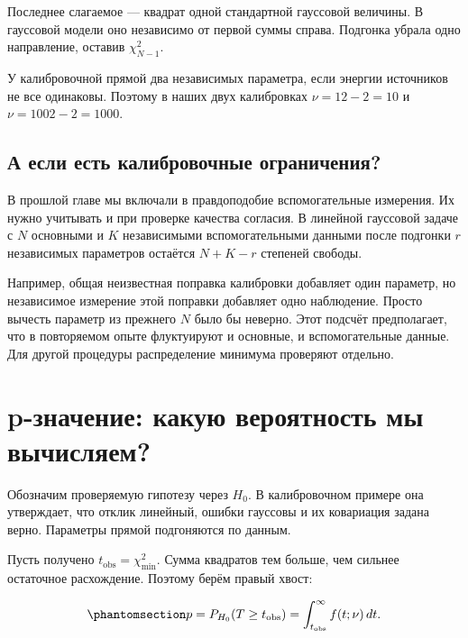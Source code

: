 \documentclass[
  russian,
  11pt,
  a4paper,
  open=any]{scrbook}
\begin{document}
Последнее слагаемое --- квадрат одной стандартной гауссовой величины. В
гауссовой модели оно независимо от первой суммы справа. Подгонка убрала
одно направление, оставив \(\chi^2_{N-1}\).

У калибровочной прямой два независимых параметра, если энергии
источников не все одинаковы. Поэтому в наших двух калибровках
\(\nu=12-2=10\) и \(\nu=1002-2=1000\).

\subsection{А если есть калибровочные
ограничения?}\label{ux430-ux435ux441ux43bux438-ux435ux441ux442ux44c-ux43aux430ux43bux438ux431ux440ux43eux432ux43eux447ux43dux44bux435-ux43eux433ux440ux430ux43dux438ux447ux435ux43dux438ux44f}

В прошлой главе мы включали в правдоподобие вспомогательные измерения.
Их нужно учитывать и при проверке качества согласия. В линейной
гауссовой задаче с \(N\) основными и \(K\) независимыми вспомогательными
данными после подгонки \(r\) независимых параметров остаётся \(N+K-r\)
степеней свободы.

Например, общая неизвестная поправка калибровки добавляет один параметр,
но независимое измерение этой поправки добавляет одно наблюдение. Просто
вычесть параметр из прежнего \(N\) было бы неверно. Этот подсчёт
предполагает, что в повторяемом опыте флуктуируют и основные, и
вспомогательные данные. Для другой процедуры распределение минимума
проверяют отдельно.

\section{p-значение: какую вероятность мы
вычисляем?}\label{p-ux437ux43dux430ux447ux435ux43dux438ux435-ux43aux430ux43aux443ux44e-ux432ux435ux440ux43eux44fux442ux43dux43eux441ux442ux44c-ux43cux44b-ux432ux44bux447ux438ux441ux43bux44fux435ux43c}

Обозначим проверяемую гипотезу через \(H_0\). В калибровочном примере
она утверждает, что отклик линейный, ошибки гауссовы и их ковариация
задана верно. Параметры прямой подгоняются по данным.

Пусть получено \(t_{\mathrm{obs}}=\chi^2_{\min}\). Сумма квадратов тем
больше, чем сильнее остаточное расхождение. Поэтому берём правый хвост:

\begin{equation}\protect\phantomsection\label{eq-chi-square-p-value}{
p=P_{H_0}(T\ge t_{\mathrm{obs}})
=\int_{t_{\mathrm{obs}}}^{\infty}f(t;\nu)\,dt.
}\end{equation}
\end{document}
